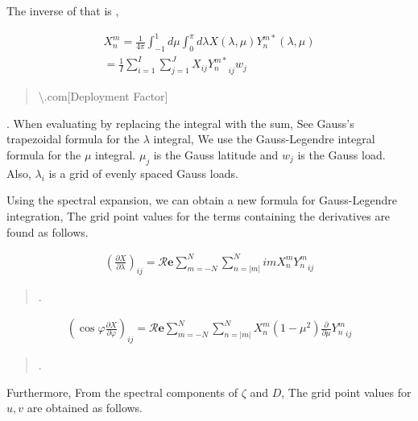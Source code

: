 The inverse of that is ,

\begin{eqnarray}
  X_n^m 
         =  \frac{1}{4 \pi} 
             \int_{-1}^{1} d \mu \int_{0}^{\pi} d \lambda 
               X( \lambda, \mu ) Y_n^{m *} ( \lambda, \mu ) \\
         =  \frac{1}{I} \sum_{i=1}^{I} \sum_{j=1}^{J}  
               X_{ij} {Y_n^{m*}}_{ij} w_j 
\end{eqnarray}

\begin{quote}
\protect\hypertarget{Deploymentux20Factor}{}{\textbackslash.com{[}Deployment
Factor{]}}
\end{quote}

. When evaluating by replacing the integral with the sum, See Gauss's
trapezoidal formula for the \(\lambda\) integral, We use the
Gauss-Legendre integral formula for the \(\mu\) integral. \(\mu_j\) is
the Gauss latitude and \(w_j\) is the Gauss load. Also, \(\lambda_i\) is
a grid of evenly spaced Gauss loads.

Using the spectral expansion, we can obtain a new formula for
Gauss-Legendre integration, The grid point values for the terms
containing the derivatives are found as follows.

\begin{eqnarray}
        \left(  \frac{\partial X}{\partial \lambda} \right)_{ij}
     =  
        {\mathcal R}\mathbf{e} \sum_{m=-N}^{N} \sum_{n=|m|}^{N} 
       im X_n^m {Y_n^m}_{ij}
\end{eqnarray}

\begin{quote}
\protect\hypertarget{barometricux20pressureux20x}{}{}.
\end{quote}

\begin{eqnarray}
   \left( \cos\varphi \frac{\partial X}{\partial \varphi} \right)_{ij}
     =  {\mathcal R}\mathbf{e} \sum_{m=-N}^{N} \sum_{n=|m|}^{N} 
       X_n^m 
       ( 1-\mu^{2} ) \frac{\partial }{\partial \mu} {Y_n^m}_{ij}
\end{eqnarray}

\begin{quote}
\protect\hypertarget{barometricux20y}{}{\blaze[barometric y]}.
\end{quote}

Furthermore, From the spectral components of \(\zeta\) and \(D\), The
grid point values for \(u,v\) are obtained as follows.

